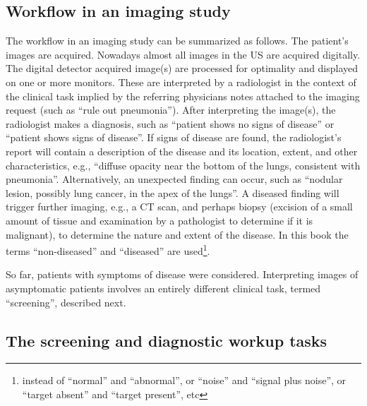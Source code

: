 \documentclass[
]{book}
\begin{document}
\hypertarget{workflow-in-an-imaging-study}{%
\subsection{Workflow in an imaging study}\label{workflow-in-an-imaging-study}}

The workflow in an imaging study can be summarized as follows. The patient's images are acquired. Nowadays almost all images in the US are acquired digitally. The digital detector acquired image(s) are processed for optimality and displayed on one or more monitors. These are interpreted by a radiologist in the context of the clinical task implied by the referring physicians notes attached to the imaging request (such as ``rule out pneumonia''). After interpreting the image(s), the radiologist makes a diagnosis, such as ``patient shows no signs of disease'' or ``patient shows signs of disease''. If signs of disease are found, the radiologist's report will contain a description of the disease and its location, extent, and other characteristics, e.g., ``diffuse opacity near the bottom of the lungs, consistent with pneumonia''. Alternatively, an unexpected finding can occur, such as ``nodular lesion, possibly lung cancer, in the apex of the lungs''. A diseased finding will trigger further imaging, e.g., a CT scan, and perhaps biopsy (excision of a small amount of tissue and examination by a pathologist to determine if it is malignant), to determine the nature and extent of the disease. In this book the terms ``non-diseased'' and ``diseased'' are used\footnote{instead of ``normal'' and ``abnormal'', or ``noise'' and ``signal plus noise'', or ``target absent'' and ``target present'', etc}.

So far, patients with symptoms of disease were considered. Interpreting images of asymptomatic patients involves an entirely different clinical task, termed ``screening'', described next.

\hypertarget{the-screening-and-diagnostic-workup-tasks}{%
\subsection{The screening and diagnostic workup tasks}\label{the-screening-and-diagnostic-workup-tasks}}
\end{document}
